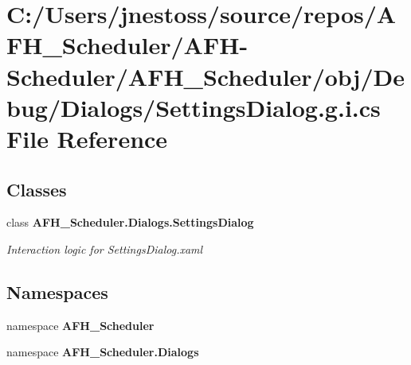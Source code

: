 \section{C\+:/\+Users/jnestoss/source/repos/\+A\+F\+H\+\_\+\+Scheduler/\+A\+F\+H-\/\+Scheduler/\+A\+F\+H\+\_\+\+Scheduler/obj/\+Debug/\+Dialogs/\+Settings\+Dialog.g.\+i.\+cs File Reference}
\label{_debug_2_dialogs_2_settings_dialog_8g_8i_8cs}
\subsection*{Classes}
\begin{DoxyCompactItemize}
\item 
class \textbf{ A\+F\+H\+\_\+\+Scheduler.\+Dialogs.\+Settings\+Dialog}
\begin{DoxyCompactList}\small\item\em Interaction logic for Settings\+Dialog.\+xaml \end{DoxyCompactList}\end{DoxyCompactItemize}
\subsection*{Namespaces}
\begin{DoxyCompactItemize}
\item 
namespace \textbf{ A\+F\+H\+\_\+\+Scheduler}
\item 
namespace \textbf{ A\+F\+H\+\_\+\+Scheduler.\+Dialogs}
\end{DoxyCompactItemize}
